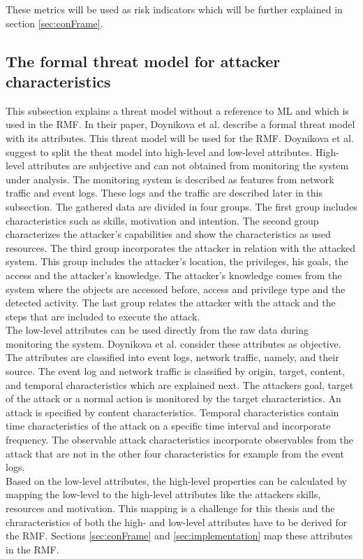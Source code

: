These metrics will be used as risk indicators which will be further explained in section \ref{sec:conFrame}.

\subsection{The formal threat model for attacker characteristics}
\label{sec:threat}

This subsection explains a threat model without a reference to ML and which is used in the RMF. In their paper, Doynikova et al. \cite{DBLP:conf/crisis/DoynikovaNGK20} describe a formal threat model with its attributes. This threat model will be used for the RMF. Doynikova et al. suggest to split the theat model into high-level and low-level attributes.
High-level attributes are subjective and can not obtained from monitoring the system under analysis. The monitoring system is described as features from network traffic and event logs. These logs and the traffic are described later in this subsection. The gathered data are divided in four groups. The first group includes characteristics such as
skills, motivation and intention. The second group characterizes the attacker's capabilities and show the characteristics as used resources. The third group incorporates the attacker in
relation with the attacked system. This group includes the attacker's location, the privileges, his goals, the access and the attacker's knowledge. The attacker's knowledge comes from the
system where the objects are accessed before, access and privilege type and the detected activity. The last group relates the attacker with the attack and the steps that are included to
execute the attack. \\
The low-level attributes can be used directly from the raw data during monitoring the system. Doynikova et al. consider these attributes as objective. The attributes are classified into event logs, network traffic, namely, and their source. The event log and network traffic is classified by origin, target, content, and temporal characteristics \cite{DBLP:journals/ijcysa/FraunholzKAS17} which are explained next. The attackers goal, target of the attack or a normal action is monitored by the target characteristics. An attack is specified by content characteristics. Temporal
characteristics contain time characteristics of the attack on a specific time interval and incorporate frequency. The observable attack characteristics incorporate observables from the attack that are not in the other four characteristics for example from the event logs. \\
Based on the low-level attributes, the high-level properties can be calculated by mapping the low-level to the high-level attributes like the attackers skills, resources and motivation. This mapping is a challenge for this thesis and the chraracteristics of both the high- and low-level attributes have to be derived for the RMF. Sections \ref{sec:conFrame} and \ref{sec:implementation} map these attributes in the RMF.

